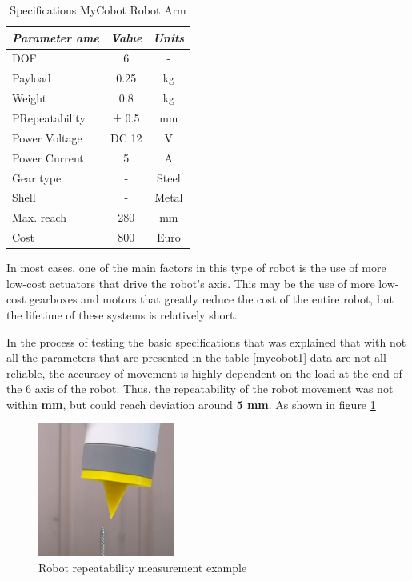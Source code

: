 \begin{table}[H]
    \caption{Specifications MyCobot Robot Arm}\label{tab:mycobot1}
    \centering
    \begin{tabular}{|l|c|c|}
        \hline
        \textit{\textbf{Parameter ame}} & \multicolumn{1}{l|}{\textit{\textbf{Value}}} & \multicolumn{1}{l|}{\textit{\textbf{Units}}} \\ \hline
        DOF                  & 6     & -     \\ \hline
        Payload              & 0.25  & kg    \\ \hline
        Weight               & 0.8   & kg    \\ \hline
        PRepeatability       & ± 0.5 & mm    \\ \hline
        Power Voltage        & DC 12 & V     \\ \hline
        Power Current        & 5     & A     \\ \hline
        Gear type            & -     & Steel \\ \hline
        Shell                & -     & Metal \\ \hline
        Max. reach           & 280     & mm \\ \hline
        Cost                 & 800    & Euro \\ \hline
        \end{tabular}
 \end{table}

 


 In most cases, one of the main factors in this type of robot is the use of more low-cost actuators that drive the robot's axis. This may be the use of more low-cost gearboxes and motors that greatly reduce the cost of the entire robot, but the lifetime of these systems is relatively short.

 In the process of testing the basic specifications that was explained that with not all the parameters that are presented in the table \ref*{mycobot1} data are not all reliable, the accuracy of movement is highly dependent on the load at the end of the 6 axis of the robot. Thus, the repeatability of the robot movement was not within \textbf{ mm}, but could reach deviation around \textbf{ 5 mm}. As shown in figure \ref*{mycobot2} 

 \begin{figure}[H]
	\centering
	\includegraphics[width=0.4\textwidth]{Src/images/mycobot2.png}
	\caption{Robot repeatability measurement example}
    \label{mycobot2}
\end{figure}

